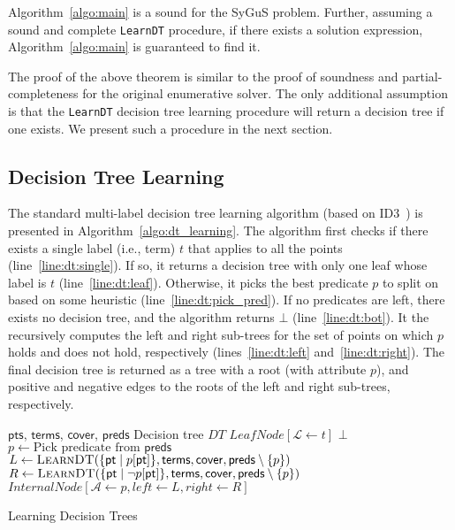 \documentclass{llncs}
\newcommand\Points{\mathsf{pts}}
\newcommand\Point{\mathsf{pt}}
\newcommand\Predicates{\mathsf{preds}}
\newcommand\Pred{p}
\newcommand\Terms{\mathsf{terms}}
\newcommand\Term{t}
\newcommand\Cover{\mathsf{cover}}
\newcommand\DecisionTree{\mathit{DT}}
\newcommand\Attribute{\mathcal{A}}
\newcommand\Label{\mathcal{L}}
\newcommand{\sygus}{{\sffamily\fontsize{8.5}{10}\selectfont
    SyGuS}\xspace}
\begin{document}
\begin{theorem}
  Algorithm~\ref{algo:main} is a sound for the \sygus problem.
  Further, assuming a sound and complete {\tt LearnDT} procedure, if
  there exists a solution expression, Algorithm~\ref{algo:main} is
  guaranteed to find it.
\end{theorem}
The proof of the above theorem is similar to the proof of soundness and
partial-completeness for the original enumerative solver.
The only additional assumption is that the {\tt LearnDT} decision tree
learning procedure will return a decision tree if one exists.
We present such a procedure in the next section.


\subsection{Decision Tree Learning}
\label{sec:decision_trees}

The standard multi-label decision tree learning algorithm (based on
ID3~\cite{quinlan-86}) is presented in Algorithm~\ref{algo:dt_learning}.
The algorithm first checks if there exists a single label (i.e., term)
$\Term$ that applies to all the points (line~\ref{line:dt:single}).
If so, it returns a decision tree with only one leaf whose label is
$\Term$ (line~\ref{line:dt:leaf}).
Otherwise, it picks the best predicate $\Pred$ to split on based on some
heuristic (line~\ref{line:dt:pick_pred}).
If no predicates are left, there exists no decision tree, and the
algorithm returns $\bot$ (line~\ref{line:dt:bot}).
It the recursively computes the left and right sub-trees for the set of
points on which $\Pred$ holds and does not hold, respectively
(lines~\ref{line:dt:left} and~\ref{line:dt:right}).
The final decision tree is returned as a tree with a root (with
attribute $\Pred$), and positive and negative edges to the roots of the
left and right sub-trees, respectively.

\begin{algorithm}
  \begin{algorithmic}[1]
    \fontsize{8}{10}\selectfont
    \Require $\Points$, $\Terms$, $\Cover$, $\Predicates$
    \Ensure Decision tree $\DecisionTree$
    \If { $\exists \Term : \Points \subseteq \Cover[\Term]$ }\label{line:dt:single}
    \Return $\mathit{LeafNode}[\Label \gets \Term]$ \label{line:dt:leaf}
    \EndIf
    \If {$\Predicates = \emptyset$} \Return $\bot$ \EndIf \label{line:dt:bot}
    \State $\Pred \gets \mbox{Pick predicate from $\Predicates$}$\label{line:dt:pick_pred}
    \State $L \gets \Call{LearnDT}{\{ \Point \mid \Pred[\Point] \},
    \Terms, \Cover, \Predicates \setminus \{ \Pred \} }$\label{line:dt:left}
    \State $R \gets \Call{LearnDT}{\{ \Point \mid \neg \Pred[\Point]
    \}, \Terms, \Cover, \Predicates \setminus \{ \Pred \} }$\label{line:dt:right}
    \State \Return $\mathit{InternalNode}[\Attribute \gets \Pred,  \mathit{left} \gets L , \mathit{right} \gets R ]$
  \end{algorithmic}
  \caption{Learning Decision Trees}
  \label{algo:dt_learning}
\end{algorithm}
\end{document}
